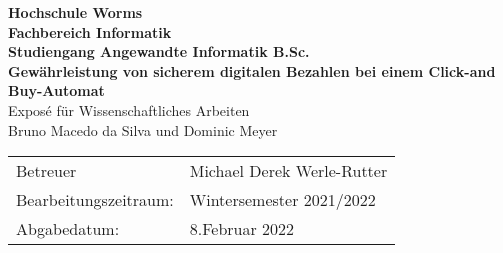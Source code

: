 \begin{titlepage}
    \vspace*{2mm}
    \begin{center}
        \Large
        \textbf{Hochschule Worms}\\
        \textbf{Fachbereich Informatik}\\
        \textbf{Studiengang Angewandte Informatik B.Sc.}\\
        \vspace{1cm}
        \textbf{Gewährleistung von sicherem digitalen Bezahlen bei einem Click-and Buy-Automat}\\
        \vspace{1cm}
        \large
        Exposé für Wissenschaftliches Arbeiten\\
        \vspace{1cm}
        Bruno Macedo da Silva und Dominic Meyer
        \vspace{3cm}
        \large
        \vspace{4cm}
         \begin {table}[ht]
             \centering
             \begin{tabular}{l l}
                Betreuer                & Michael Derek Werle-Rutter \\
                Bearbeitungszeitraum:   & Wintersemester 2021/2022 \\
                Abgabedatum:            & 8.Februar 2022 \\
             \end{tabular}
         \end {table}
    \end{center}
    \normalsize
    \vfill
 


\end{titlepage}